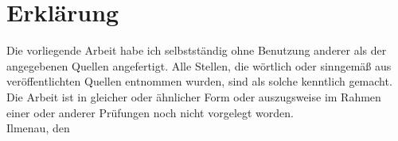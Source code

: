 %
%
%
%

\chapter*{Erklärung}
\thispagestyle{empty}
Die vorliegende Arbeit habe ich selbstständig ohne Benutzung anderer als der
angegebenen Quellen angefertigt. Alle Stellen, die wörtlich oder sinngemäß
aus veröffentlichten Quellen entnommen wurden, sind als solche
kenntlich gemacht. Die Arbeit ist in gleicher oder ähnlicher Form oder
auszugsweise im Rahmen einer oder anderer Prüfungen noch nicht vorgelegt
worden.
\\[2cm]
Ilmenau, den \hfill \namedesautors
